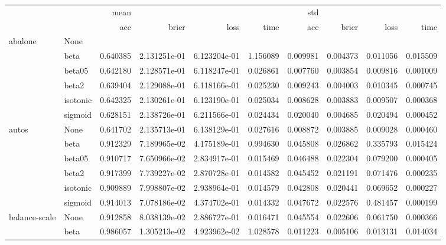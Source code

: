 \begin{tabular}{llrrrrrrrr}
\toprule
        &      &      mean &               &               &            &       std &           &           &           \\
        &      &       acc &         brier &          loss &       time &       acc &     brier &      loss &      time \\
\midrule
abalone & None &           &               &               &            &           &           &           &           \\
        & beta &  0.640385 &  2.131251e-01 &  6.123204e-01 &   1.156089 &  0.009981 &  0.004373 &  0.011056 &  0.015509 \\
        & beta05 &  0.642180 &  2.128571e-01 &  6.118247e-01 &   0.026861 &  0.007760 &  0.003854 &  0.009816 &  0.001009 \\
        & beta2 &  0.639404 &  2.129088e-01 &  6.118166e-01 &   0.025230 &  0.009243 &  0.004003 &  0.010345 &  0.000745 \\
        & isotonic &  0.642325 &  2.130261e-01 &  6.123190e-01 &   0.025034 &  0.008628 &  0.003883 &  0.009507 &  0.000368 \\
        & sigmoid &  0.628151 &  2.138726e-01 &  6.211566e-01 &   0.024434 &  0.020040 &  0.004685 &  0.020494 &  0.000452 \\
autos & None &  0.641702 &  2.135713e-01 &  6.138129e-01 &   0.027616 &  0.008872 &  0.003885 &  0.009028 &  0.000460 \\
        & beta &  0.912329 &  7.189965e-02 &  4.175189e-01 &   0.994630 &  0.045808 &  0.026862 &  0.335793 &  0.015424 \\
        & beta05 &  0.910717 &  7.650966e-02 &  2.834917e-01 &   0.015469 &  0.046488 &  0.022304 &  0.079200 &  0.000405 \\
        & beta2 &  0.917399 &  7.739227e-02 &  2.870728e-01 &   0.014582 &  0.045452 &  0.021191 &  0.071476 &  0.000235 \\
        & isotonic &  0.909889 &  7.998807e-02 &  2.938964e-01 &   0.014579 &  0.042808 &  0.020441 &  0.069652 &  0.000227 \\
        & sigmoid &  0.914013 &  7.078186e-02 &  4.374702e-01 &   0.014332 &  0.047672 &  0.022576 &  0.481457 &  0.000199 \\
balance-scale & None &  0.912858 &  8.038139e-02 &  2.886727e-01 &   0.016471 &  0.045554 &  0.022606 &  0.061750 &  0.000366 \\
        & beta &  0.986057 &  1.305213e-02 &  4.923962e-02 &   1.028578 &  0.011223 &  0.005106 &  0.013131 &  0.014034 \\

\end{tabular}
